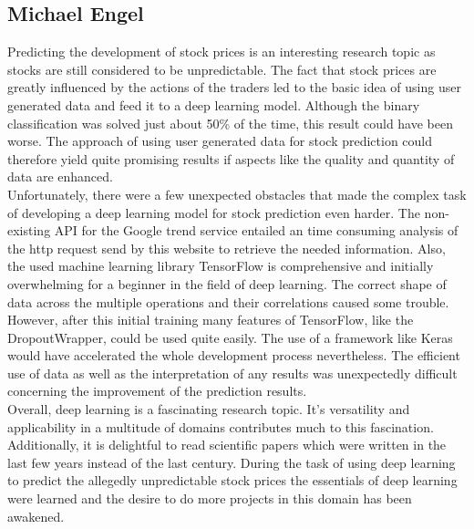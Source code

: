 \subsection{Michael Engel}
\label{sec:llME}
Predicting the development of stock prices is an interesting research topic as stocks are still considered to be unpredictable. The fact that stock prices are greatly influenced by the actions of the traders led to the basic idea of using user generated data and feed it to a deep learning model. Although the binary classification was solved just about 50\% of the time, this result could have been worse. The approach of using user generated data for stock prediction could therefore yield quite promising results if aspects like the quality and quantity of data are enhanced. 
\\
Unfortunately, there were a few unexpected obstacles that made the complex task of developing a deep learning model for stock prediction even harder. The non-existing API for the Google trend service entailed an time consuming analysis of the http request send by this website to retrieve the needed information. Also, the used machine learning library TensorFlow is comprehensive and initially overwhelming for a beginner in the field of deep learning. The correct shape of data across the multiple operations and their correlations caused some trouble. However, after this initial training many features of TensorFlow, like the DropoutWrapper, could be used quite easily. The use of a framework like Keras would have accelerated the whole development process nevertheless. The efficient use of data as well as the interpretation of any results was unexpectedly difficult concerning the improvement of the prediction results. 
\\
Overall, deep learning is a fascinating research topic. It's versatility and applicability in a multitude of domains contributes much to this fascination. Additionally, it is delightful to read scientific papers which were written in the last few years instead of the last century. During the task of using deep learning to predict the allegedly unpredictable stock prices the essentials of deep learning were learned and the desire to do more projects in this domain has been awakened. 